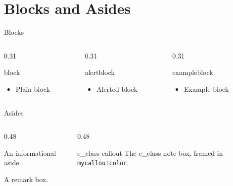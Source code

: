 \documentclass[aspectratio=169]{beamer}
\begin{document}
\section{Blocks and Asides}
\sepframe

\begin{frame}{Blocks}
  \begin{columns}[T]
    \begin{column}{0.31\textwidth}
      \begin{block}{block}
        \begin{itemize}
          \item Plain block
        \end{itemize}
      \end{block}
    \end{column}
    \begin{column}{0.31\textwidth}
      \begin{alertblock}{alertblock}
        \begin{itemize}
          \item Alerted block
        \end{itemize}
      \end{alertblock}
    \end{column}
    \begin{column}{0.31\textwidth}
      \begin{exampleblock}{exampleblock}
        \begin{itemize}
          \item Example block
        \end{itemize}
      \end{exampleblock}
    \end{column}
  \end{columns}
\end{frame}

\begin{frame}{Asides}
  \begin{columns}[T]
    \begin{column}{0.48\textwidth}
      \begin{information}
        An informational aside.
      \end{information}
      \begin{remark}[Scope]
        A remark box.
      \end{remark}
    \end{column}
    \begin{column}{0.48\textwidth}
      \begin{callout}{e\_class callout}
        The e\_class note box, framed in \texttt{mycalloutcolor}.
      \end{callout}
    \end{column}
  \end{columns}
\end{frame}
\end{document}
